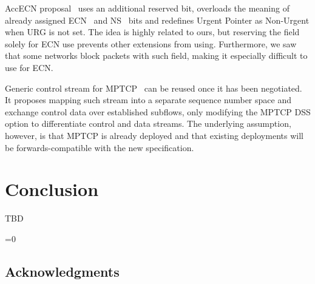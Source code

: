 \documentclass{sig-alternate-10pt}
\def\anon{1}        %
\begin{document}
AccECN proposal~\cite{Kuhlewind:2014vd} uses an additional reserved bit, overloads the meaning of already assigned ECN~\cite{Floyd:up} and NS~\cite{Ely:uc} bits and redefines Urgent Pointer as Non-Urgent when URG is not set. The idea is highly related to ours, but reserving the field solely for ECN use prevents other extensions from using. Furthermore, we saw that some networks block packets with such field, making it especially difficult to use for ECN.

Generic control stream for MPTCP~\cite{Bonaventure:wx} can be reused once it has been negotiated. It proposes mapping such stream into a separate sequence number space and exchange control data over established subflows, only modifying the MPTCP DSS option to differentiate control and data streams. The underlying assumption, however, is that MPTCP is already deployed and that existing deployments will be forwards-compatible with the new specification.



\section{Conclusion}
TBD
%

\ifnum\anon=0
\subsection*{Acknowledgments}

\fi


{


\small 

}

%
\end{document}
